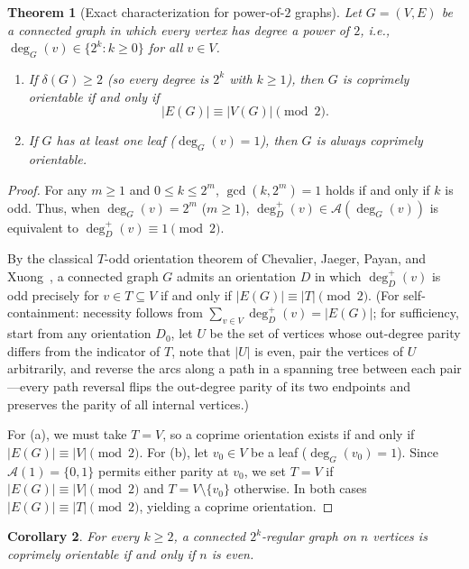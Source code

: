 \documentclass[11pt,a4paper]{article}
\newtheorem{theorem}{Theorem}[section]
\newtheorem{corollary}[theorem]{Corollary}
\theoremstyle{definition}
\theoremstyle{remark}
\newcommand{\outdeg}{\deg^{+}}
\newcommand{\Aset}{\mathcal{A}}
\begin{document}
\begin{theorem}[Exact characterization for power-of-$2$ graphs]\label{thm:pow2}
Let $G = (V, E)$ be a connected graph in which every vertex has degree a power of $2$, i.e., $\deg_G(v) \in \{2^k : k \ge 0\}$ for all $v \in V$.
\begin{enumerate}[label=(\alph*)]
  \item If $\delta(G) \ge 2$ (so every degree is $2^k$ with $k \ge 1$), then $G$ is coprimely orientable if and only if
  \[
    |E(G)| \equiv |V(G)| \pmod{2}.
  \]
  \item If $G$ has at least one leaf ($\deg_G(v) = 1$), then $G$ is always coprimely orientable.
\end{enumerate}
\end{theorem}

\begin{proof}
For any $m \ge 1$ and $0 \le k \le 2^m$, $\gcd(k, 2^m) = 1$ holds if and only if $k$ is odd. Thus, when $\deg_G(v) = 2^m$ ($m \ge 1$), $\outdeg_D(v) \in \Aset(\deg_G(v))$ is equivalent to $\outdeg_D(v) \equiv 1 \pmod{2}$.

By the classical $T$-odd orientation theorem of Chevalier, Jaeger, Payan, and Xuong~\cite{Chevalier1983}, a connected graph $G$ admits an orientation $D$ in which $\outdeg_D(v)$ is odd precisely for $v \in T \subseteq V$ if and only if $|E(G)| \equiv |T| \pmod{2}$. (For self-containment: necessity follows from $\sum_{v \in V} \outdeg_D(v) = |E(G)|$; for sufficiency, start from any orientation $D_0$, let $U$ be the set of vertices whose out-degree parity differs from the indicator of $T$, note that $|U|$ is even, pair the vertices of $U$ arbitrarily, and reverse the arcs along a path in a spanning tree between each pair—every path reversal flips the out-degree parity of its two endpoints and preserves the parity of all internal vertices.)

For (a), we must take $T = V$, so a coprime orientation exists if and only if $|E(G)| \equiv |V| \pmod{2}$.
For (b), let $v_0 \in V$ be a leaf ($\deg_G(v_0) = 1$). Since $\Aset(1) = \{0, 1\}$ permits either parity at $v_0$, we set $T = V$ if $|E(G)| \equiv |V| \pmod{2}$ and $T = V \setminus \{v_0\}$ otherwise. In both cases $|E(G)| \equiv |T| \pmod{2}$, yielding a coprime orientation.
\end{proof}

\begin{corollary}
For every $k \ge 2$, a connected $2^k$-regular graph on $n$ vertices is coprimely orientable if and only if $n$ is even.
\end{corollary}
\end{document}

